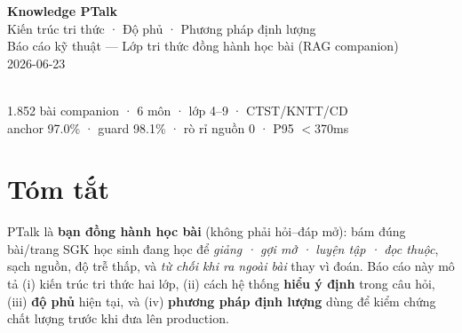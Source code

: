 \documentclass[11pt,a4paper]{article}
\begin{document}
\begin{titlepage}
\centering
\vspace*{2.5cm}
{\sffamily\Huge\bfseries\color{cprim} Knowledge PTalk}\\[6pt]
{\sffamily\LARGE Kiến trúc tri thức · Độ phủ · Phương pháp định lượng}\\[18pt]
{\large Báo cáo kỹ thuật — Lớp tri thức đồng hành học bài (RAG companion)}\\[10pt]
{\color{cgray}\large 2026-06-23}\\[1.4cm]
\\[1cm]
{\color{cgray}\small 1.852 bài companion · 6 môn · lớp 4–9 · CTST/KNTT/CD\\ anchor 97.0\% · guard 98.1\% · rò rỉ nguồn 0 · P95 $<$370ms}
\vfill
\end{titlepage}

\tableofcontents
\newpage

\section{Tóm tắt}
PTalk là \textbf{bạn đồng hành học bài} (không phải hỏi--đáp mở): bám đúng bài/trang SGK học sinh
đang học để \emph{giảng · gợi mở · luyện tập · đọc thuộc}, sạch nguồn, độ trễ thấp, và
\emph{từ chối khi ra ngoài bài} thay vì đoán. Báo cáo này mô tả (i) kiến trúc tri thức hai lớp,
(ii) cách hệ thống \textbf{hiểu ý định} trong câu hỏi, (iii) \textbf{độ phủ} hiện tại, và
(iv) \textbf{phương pháp định lượng} dùng để kiểm chứng chất lượng trước khi đưa lên production.
\end{document}
